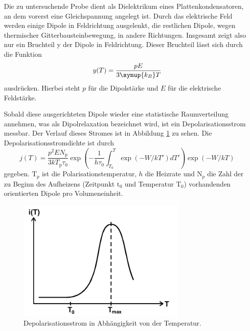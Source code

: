 Die zu untersuchende Probe dient als Dielektrikum eines Plattenkondensatoren, an dem vorerst eine Gleichspannung angelegt ist.
Durch das elektrische Feld werden einige Dipole in Feldrichtung ausgelenkt, die restlichen Dipole, wegen thermischer Gitterbausteinbewegung, in andere Richtungen.
Insgesamt zeigt also nur ein Bruchteil y der Dipole in Feldrichtung.
Dieser Bruchteil lässt sich durch die Funktion
\begin{equation}
    y(T)=\frac{pE}{3\symup{k_B}T}
\end{equation}
ausdrücken.
Hierbei steht $p$ für die Dipolstärke und $E$ für die elektrische Feldstärke.

Sobald diese ausgerichteten Dipole wieder eine statistische Raumverteilung annehmen, was als Dipolrelaxation bezeichnet wird, ist ein Depolarisationsstrom messbar.
Der Verlauf dieses Stromes ist in Abbildung \ref{fig:Strom} zu sehen.
Die Depolarisationsstromdichte ist durch
\begin{equation}
    j(T)=\frac{p^2 E N_\text{p}}{3kT_\text{p}\tau_0}\exp\left(-\frac{1}{h\tau_0}\int_{T_0}^{T}\exp(-W/kT')dT'\right)\exp(-W/kT)
\end{equation}
gegeben.
$\text{T}_p$ ist die Polarisationstemperatur, $h$ die Heizrate und $\text{N}_p$ die Zahl der zu Beginn des Aufheizens (Zeitpunkt $\text{t}_0$ und Temperatur $\text{T}_0$) vorhandenden orientierten Dipole pro Volumeneinheit.
\begin{figure}[htb]
    \centering
    \includegraphics[height=6cm]{pics/Strom.png}
    \caption{Depolarisationsstrom in Abhängigkeit von der Temperatur. \cite{anleitung}}
    \label{fig:Strom}
\end{figure}
\FloatBarrier


\FloatBarrier